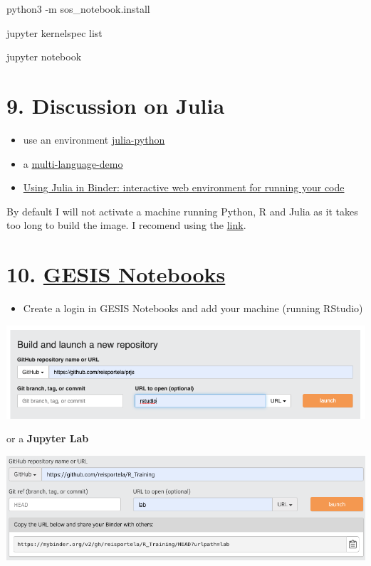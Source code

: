 \documentclass[
  12pt,
]{article}
\providecommand{\tightlist}{%
  \setlength{\itemsep}{0pt}\setlength{\parskip}{0pt}}
\begin{document}
python3 -m sos\_notebook.install

jupyter kernelspec list

jupyter notebook

\hypertarget{discussion-on-julia}{%
\section{9. Discussion on Julia}\label{discussion-on-julia}}

\begin{itemize}
\item
  use an environment
  \href{https://github.com/binder-examples/julia-python}{julia-python}
\item
  a
  \href{https://blog.jupyter.org/i-python-you-r-we-julia-baf064ca1fb6}{multi-language-demo}
\item
  \href{https://discourse.julialang.org/t/using-julia-in-binder-interactive-web-environment-for-running-your-code/21802}{Using
  Julia in Binder: interactive web environment for running your code}
\end{itemize}

By default I will not activate a machine running Python, R and Julia as
it takes too long to build the image. I recomend using the
\href{http://beta.mybinder.org/v2/gh/binder-examples/julia_python/master}{link}.

\hypertarget{gesis-notebooks}{%
\section{\texorpdfstring{10. \href{https://notebooks.gesis.org/}{GESIS
Notebooks}}{10. GESIS Notebooks}}\label{gesis-notebooks}}

\begin{itemize}
\tightlist
\item
  Create a login in GESIS Notebooks and add your machine (running
  RStudio)
\end{itemize}

\includegraphics{figures/GESISNotebooks.png}

or a \textbf{Jupyter Lab}

\includegraphics{figures/jupyter_lab.png}
\end{document}
